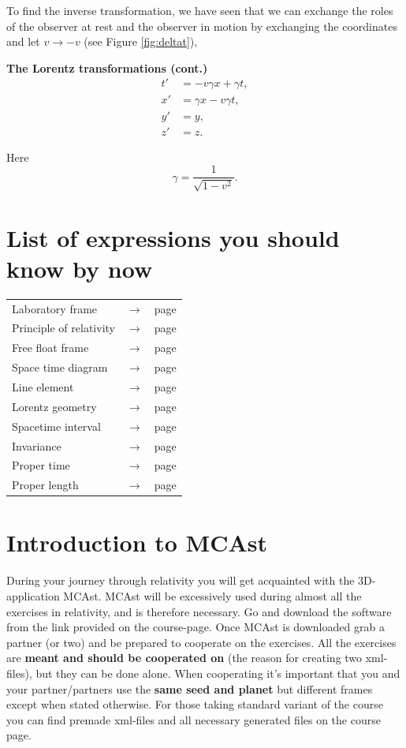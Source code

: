 {\begin{multicols}{2}
To find the inverse transformation, we have seen that we can exchange the roles of the observer at rest and the observer in motion by exchanging the coordinates and let $v\rightarrow -v$ (see Figure \ref{fig:deltat}),
\begin{formbox}
\textbf{The Lorentz transformations (cont.)}
\begin{align}
t'&=-v\gamma x+\gamma t,\label{eq:blorentz1}\\
x'&=\gamma x-v\gamma t,\label{eq:blorentz2}\\
y'&=y,\nonumber \\
z'&=z.\nonumber
\end{align}
\end{formbox}
Here 
\[
\gamma=\frac{1}{\sqrt{1-v^2}}.
\]

\section{List of expressions you should know by now}
\begin{tabular}{l c l}
Laboratory frame 	& $\rightarrow$ & page \pageref{pg:labframe}\\
Principle of relativity & $\rightarrow$ & page \pageref{pg:por}\\
Free float frame 	& $\rightarrow$ & page \pageref{pg:ff}\\
Space time diagram	& $\rightarrow$ & page \pageref{pg:spacetimediag}\\
Line element 		& $\rightarrow$ & page \pageref{pg:lineelement}\\
Lorentz geometry 	& $\rightarrow$ & page \pageref{pg:lorentz}\\
Spacetime interval 	& $\rightarrow$ & page \pageref{pg:spacetimeinterval}\\
Invariance 		& $\rightarrow$ & page \pageref{pg:invariant}\\
Proper time		& $\rightarrow$ & page \pageref{pg:propertime}\\
Proper length 		& $\rightarrow$ & page \pageref{pg:properlength}
\end{tabular}

\section{Introduction to MCAst}

During your journey through relativity you will get acquainted with the 3D-application MCAst. MCAst will be excessively used during almost all the exercises in relativity, and is therefore necessary. Go and download the software from the link provided on the course-page. Once MCAst is downloaded grab a partner (or two) and be prepared to cooperate on the exercises. All the exercises are {\bf meant and should be cooperated on} (the reason for creating two xml-files), but they can be done alone. When cooperating it's important that you and your partner/partners use the \textbf{same seed and planet} but different frames except when stated otherwise. For those taking standard variant of the course you can find premade xml-files and all necessary generated files on the course page.


\end{multicols}}

